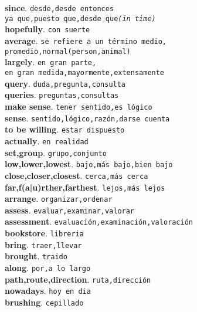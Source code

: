 \documentclass[twocolumn]{article}
\begin{document}
	\textsf{\textbf{since}}. \texttt{desde,desde entonces\\ya que,puesto que,desde que{\scriptsize \textsl{(in time)}}}\\
	\textsf{\textbf{hopefully}}. \texttt{con suerte}\\
	\textsf{\textbf{average}}. \texttt{se refiere a un t\'ermino medio,\\promedio,normal(person,animal)}\\
	\textsf{\textbf{largely}}. \texttt{en gran parte,\\en gran medida,mayormente,extensamente}\\
	\textsf{\textbf{query}}. \texttt{duda,pregunta,consulta}\\
	\textsf{\textbf{queries}}. \texttt{preguntas,consultas}\\
	\textsf{\textbf{make sense}}. \texttt{tener sentido,es l\'ogico}\\
	\textsf{\textbf{sense}}. \texttt{sentido,l\'ogico,raz\'on,darse cuenta}\\
	\textsf{\textbf{to be willing}}. \texttt{estar dispuesto}\\
	\textsf{\textbf{actually}}. \texttt{en realidad}\\
	\textsf{\textbf{set,group}}. \texttt{grupo,conjunto}\\
	\textsf{\textbf{low,lower,lowest}}. \texttt{bajo,m\'as bajo,bien bajo}\\
	\textsf{\textbf{close,closer,closest}}. \texttt{cerca,m\'as cerca}\\
	\textsf{\textbf{far,f(a|u)rther,farthest}}. \texttt{lejos,m\'as lejos}\\
	\textsf{\textbf{arrange}}. \texttt{organizar,ordenar}\\
	\textsf{\textbf{assess}}. \texttt{evaluar,examinar,valorar}\\
	\textsf{\textbf{assessment}}. \texttt{evaluaci\'on,examinaci\'on,valoraci\'on}\\
	\textsf{\textbf{bookstore}}. \texttt{libreria}\\
	\textsf{\textbf{bring}}. \texttt{traer,llevar}\\
	\textsf{\textbf{brought}}. \texttt{traido}\\
	\textsf{\textbf{along}}. \texttt{por,a lo largo}\\
	\textsf{\textbf{path,route,direction}}. \texttt{ruta,direcci\'on}\\
	\textsf{\textbf{nowadays}}. \texttt{hoy en dia}\\
	\textsf{\textbf{brushing}}. \texttt{cepillado}\\
\end{document}
